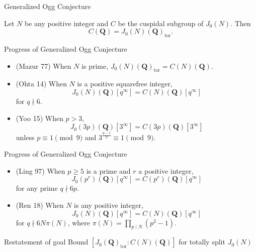 \documentclass{beamer}
\newcommand{\QQ}{\mathbf{Q}}
\newcommand{\tor}{\mathrm{tor}}
\begin{document}
\begin{frame}{Generalized Ogg Conjecture}
    \begin{conjecture}
        Let $N$ be any positive integer and $C$ be the cuspidal subgroup of
        $J_0(N)$. Then
        \[
            C(\QQ) = J_0(N)(\QQ)_\tor.
        \]
    \end{conjecture}
\end{frame}

\begin{frame}{Progress of Generalized Ogg Conjecture}
    \begin{itemize}
        \item 
            (Mazur 77) When $N$ is prime, $J_0(N)(\QQ)_\tor =C(N)(\QQ)$.
            \pause
        \item
            (Ohta 14) When $N$ is a positive squarefree integer,
            \[
                J_0(N)(\QQ)[q^\infty]=C(N)(\QQ)[q^\infty]
            \]
            for $q\nmid 6$.
        \item
            (Yoo 15) When $p>3$,
            \[
                J_0(3p)(\QQ)[3^\infty] = C(3p)(\QQ)[3^\infty]
            \]
            unless $p\equiv 1 \pmod{9}$ and $3^{\frac{p-1}{3}} \equiv 1
            \pmod{9}$.
    \end{itemize}
\end{frame}

\begin{frame}{Progress of Generalized Ogg Conjecture}
    \begin{itemize}
        \item
            (Ling 97) When $p\geq 5$ is a prime and $r$ a positive integer,
            \[
                J_0(p^r)(\QQ)[q^\infty] = C(p^r)(\QQ)[q^\infty]
            \]
            for any prime $q\nmid 6p$.
        \item
            (Ren 18) When $N$ is any positive integer,
            \[
                J_0(N)(\QQ)[q^\infty]=C(N)(\QQ)[q^\infty]
            \]
            for $q\nmid 6N\pi(N)$, where $\pi(N) = \prod_{p\mid N}
            (p^2-1)$.
    \end{itemize}
\end{frame}

\begin{frame}{Restatement of goal}
    \large{Bound $[J_0(\QQ)_\tor:C(N)(\QQ)]$ for totally split $J_0(N)$}
\end{frame}
\end{document}
